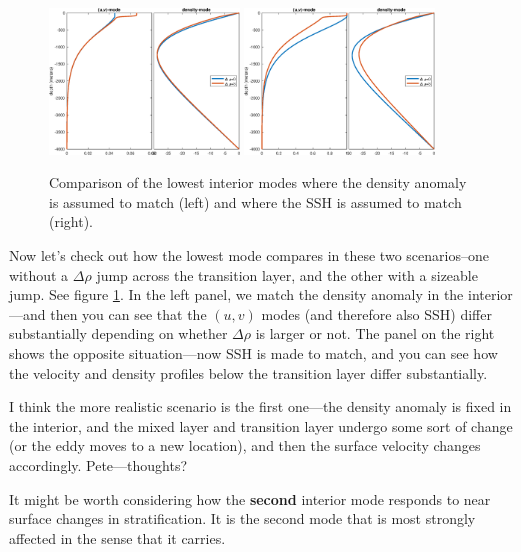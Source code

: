 \documentclass{article}
\begin{document}
\begin{figure}
\vspace{-30pt}
    \includegraphics[width=0.45\textwidth]{ModesWithDeltaRhoComparisonDensityMatched}
    \includegraphics[width=0.45\textwidth]{ModesWithDeltaRhoComparisonSSHMatched}
  \caption{Comparison of the lowest interior modes where the density anomaly is assumed to match (left) and where the SSH is assumed to match (right). }
  \label{ModesWithDeltaRhoComparison}
\end{figure}

Now let's check out how the lowest mode compares in these two scenarios--one without a $\Delta \rho$ jump across the transition layer, and the other with a sizeable jump. See figure \ref{ModesWithDeltaRhoComparison}. In the left panel, we match the density anomaly in the interior---and then you can see that the $(u,v)$ modes (and therefore also SSH) differ substantially depending on whether $\Delta \rho$ is larger or not. The panel on the right shows the opposite situation---now SSH is made to match, and you can see how the velocity and density profiles below the transition layer differ substantially.

I think the more realistic scenario is the first one---the density anomaly is fixed in the interior, and the mixed layer and transition layer undergo some sort of change (or the eddy moves to a new location), and then the surface velocity changes accordingly. Pete---thoughts?


It might be worth considering how the \textbf{second} interior mode responds to near surface changes in stratification. It is the second mode that is most strongly affected in the sense that it carries.



\end{document}
